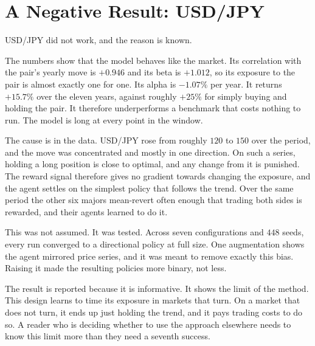 \section{A Negative Result: USD/JPY}
\label{Section:NegativeResult}

USD/JPY did not work, and the reason is known.

The numbers show that the model behaves like the market. Its correlation with the pair's yearly move is $+0.946$ and its beta is $+1.012$, so its exposure to the pair is almost exactly one for one. Its alpha is $-1.07\%$ per year. It returns $+15.7\%$ over the eleven years, against roughly $+25\%$ for simply buying and holding the pair. It therefore underperforms a benchmark that costs nothing to run. The model is long at every point in the window.

The cause is in the data. USD/JPY rose from roughly $120$ to $150$ over the period, and the move was concentrated and mostly in one direction. On such a series, holding a long position is close to optimal, and any change from it is punished. The reward signal therefore gives no gradient towards changing the exposure, and the agent settles on the simplest policy that follows the trend. Over the same period the other six majors mean-revert often enough that trading both sides is rewarded, and their agents learned to do it.

This was not assumed. It was tested. Across seven configurations and $448$ seeds, every run converged to a directional policy at full size. One augmentation shows the agent mirrored price series, and it was meant to remove exactly this bias. Raising it made the resulting policies more binary, not less.

The result is reported because it is informative. It shows the limit of the method. This design learns to time its exposure in markets that turn. On a market that does not turn, it ends up just holding the trend, and it pays trading costs to do so. A reader who is deciding whether to use the approach elsewhere needs to know this limit more than they need a seventh success.